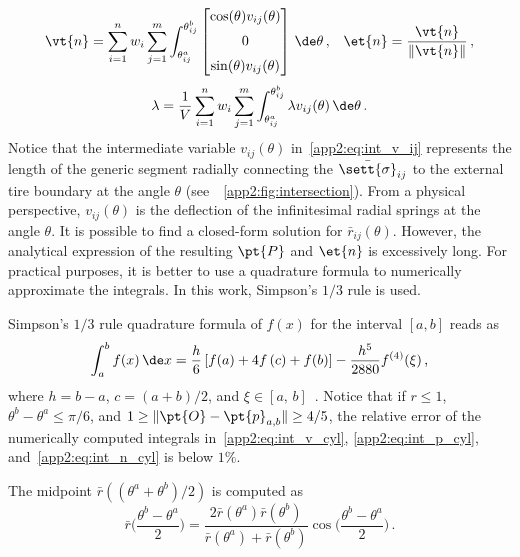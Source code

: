 %
\begin{equation}
  \vt{n} =
  \sum_{i=1}^{n}w_i\sum_{j=1}^{m} \displaystyle\int_{\theta^a_{ij}}^{\theta^b_{ij}}
  \begin{bmatrix}
    \cos(\theta)v_{ij}(\theta)
    \\[2mm]
    0
    \\[2mm]
    \sin(\theta)v_{ij}(\theta)
  \end{bmatrix} \, \de\theta  \, \text{,} \quad
  \et{n} = \dfrac{\vt{n}}{\|\vt{n}\|}
   \, \text{,}
  \label{app2:eq:int_n_cyl}
\end{equation}
%
\begin{equation}
  \lambda = \dfrac{1}{V} \sum_{i=1}^{n}w_i\sum_{j=1}^{m} \int_{\theta^a_{ij}}^{\theta^b_{ij}} \lambda v_{ij}(\theta) \, \de\theta
  \, \text{.}
  \label{app2:eq:int_l_cyl}
\end{equation}
%
Notice that the intermediate variable $v_{ij}(\theta)$ in~\eqref{app2:eq:int_v_ij} represents the length of the generic segment radially connecting the $\bar{\sett{\sigma}}_{ij}$ to the external tire boundary at the angle $\theta$ (see~\figurename{}~\ref{app2:fig:intersection}). From a physical perspective, $v_{ij}(\theta)$ is the deflection of the infinitesimal radial springs at the angle $\theta$. It is possible to find a closed-form solution for $\bar{r}_{ij}(\theta)$. However, the analytical expression of the resulting $\pt{P}$ and $\et{n}$ is excessively long. For practical purposes, it is better to use a quadrature formula to numerically approximate the integrals. In this work, Simpson's $1/3$ rule is used.
%
\begin{remark}
  Simpson's $1/3$ rule quadrature formula of $f(x)$ for the interval $[a,b]$ reads as
  \begin{equation*}
    \int_{a}^b f(x)\,\de x = \dfrac{h}{6}\left[ f(a) + 4f\left(c\right)+f(b)\right] - \dfrac{h^5}{2880} f^{(4)}(\xi)
     \, \text{,}
  \end{equation*}
  where $h = b-a$, $c = (a+b)/2$, and $\xi \in [a, \, b]$~\cite{stoer2002introduction}. Notice that if $r \leq 1$, $\theta^b-\theta^a \leq \pi/6$, and $1 \geq \|\pt{O}-\pt{p}_{a,b}\| \geq 4/5$, the relative error of the numerically computed integrals in~\eqref{app2:eq:int_v_cyl}, \eqref{app2:eq:int_p_cyl}, and~\eqref{app2:eq:int_n_cyl} is below $1\%$.
\end{remark}
%
\begin{remark}
  The midpoint $\bar{r}((\theta^a+\theta^b)/2)$ is computed as
  \begin{equation*}
    \bar{r}\bigg(\dfrac{\theta^b-\theta^a}{2}\bigg) = \dfrac{2\bar{r}(\theta^a)\bar{r}(\theta^b)}{\bar{r}(\theta^a)+\bar{r}(\theta^b)}\cos\bigg(\dfrac{\theta^b-\theta^a}{2}\bigg)
    \, \text{.}
  \end{equation*}
\end{remark}

